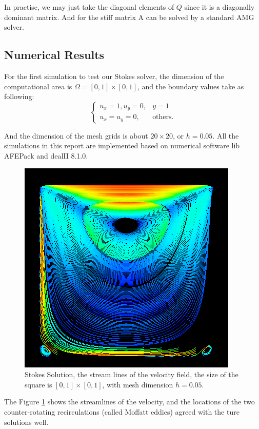 \documentclass[a4paper]{article}
\begin{document}
In practise, we may just take the diagonal elements of $Q$ since it is
a diagonally dominant matrix. And for the stiff matrix A can be solved
by a standard AMG solver.

\subsection{Numerical Results}
For the first simulation to test our Stokes solver, the dimension of
the computational area is $\Omega = [0,1]\times[0,1]$, and the
boundary values take as following:
\begin{equation}
\left\lbrace
\begin{array}{ll}
u_x = 1, u_y = 0, & y = 1 \\
u_x = u_y = 0, & \mbox{others}.
\end{array}
\right.
\label{bd::value1}
\end{equation}

And the dimension of the mesh grids is about $20 \times 20$, or
$h=0.05$. All the simulations in this report are implemented based on
numerical software lib AFEPack and dealII 8.1.0. 

\begin{figure}[h]
\centering
\includegraphics[scale = 0.4]{images/Stokes.png}
\caption{Stokes Solution, the stream lines of the velocity field, the
  size of the square is $[0, 1] \times [0, 1]$, with mesh dimension $h = 0.05$.}
\label{im::Stokes-Solution}
\end{figure}

The Figure \ref{im::Stokes-Solution} shows the streamlines of the
velocity, and the locations of the two counter-rotating recirculations
(called Moffatt eddies) agreed with the ture solutions well.  
\end{document}
